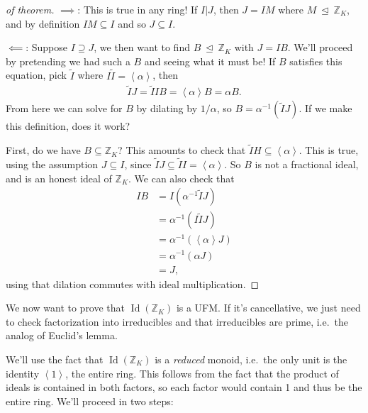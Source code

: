 \begin{proof}[of theorem]

\(\implies\): This is true in any ring! If \(I\mathrel{\Big|}J\), then
\(J = IM\) where \(M {~\trianglelefteq~}{\mathbb{Z}}_K\), and by
definition \(IM \subseteq I\) and so \(J \subseteq I\).

\(\impliedby\): Suppose \(I \supseteq J\), we then want to find
\(B {~\trianglelefteq~}{\mathbb{Z}}_K\) with \(J = IB\). We'll proceed
by pretending we had such a \(B\) and seeing what it must be! If \(B\)
satisfies this equation, pick \(\tilde I\) where
\(I\tilde I = \left\langle{ \alpha}\right\rangle\), then
\begin{align*}
\tilde I J = \tilde I I B = \left\langle{ \alpha }\right\rangle B = \alpha B 
.\end{align*}
From here we can solve for \(B\) by dilating by \(1/ \alpha\), so
\(B = \alpha ^{-1} (\tilde I J)\). If we make this definition, does it
work?

First, do we have \(B \subseteq {\mathbb{Z}}_K\)? This amounts to check
that \(\tilde I H \subseteq \left\langle{ \alpha }\right\rangle\). This
is true, using the assumption \(J \subseteq I\), since
\(\tilde I J \subseteq \tilde I I = \left\langle{ \alpha }\right\rangle\).
So \(B\) is not a fractional ideal, and is an honest ideal of
\({\mathbb{Z}}_K\). We can also check that
\begin{align*}
IB 
&= I( \alpha ^{-1} \tilde I J) \\
& = \alpha^{-1}(I \tilde I J) \\
&= \alpha^{-1}( \left\langle{ \alpha }\right\rangle J ) \\
&= \alpha ^{-1} ( \alpha J) \\
&= J
,\end{align*}
using that dilation commutes with ideal multiplication.

\end{proof}

\begin{remark}

We now want to prove that \(\operatorname{Id}({\mathbb{Z}}_K)\) is a
UFM. If it's cancellative, we just need to check factorization into
irreducibles and that irreducibles are prime, i.e.~the analog of
Euclid's lemma.

\end{remark}

\begin{remark}

We'll use the fact that \(\operatorname{Id}({\mathbb{Z}}_K)\) is a
\emph{reduced} monoid, i.e.~the only unit is the identity
\(\left\langle{ 1 }\right\rangle\), the entire ring. This follows from
the fact that the product of ideals is contained in both factors, so
each factor would contain 1 and thus be the entire ring. We'll proceed
in two steps:

\end{remark}

